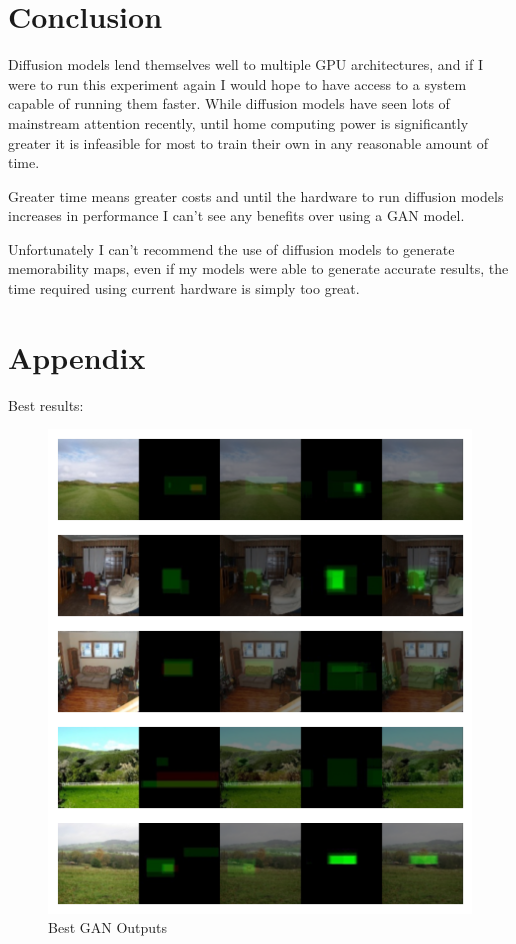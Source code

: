 \documentclass{UoYCSproject}
\begin{document}
\chapter{Conclusion}




Diffusion models lend themselves well to multiple GPU architectures, and if I were to run this experiment again I would hope to have access to a system capable of running them faster. While diffusion models have seen lots of mainstream attention recently, until home computing power is significantly greater it is infeasible for most to train their own in any reasonable amount of time. 

Greater time means greater costs and until the hardware to run diffusion models increases in performance I can't see any benefits over using a GAN model.

Unfortunately I can't recommend the use of diffusion models to generate memorability maps, even if my models were able to generate accurate results, the time required using current hardware is simply too great.

\printbibliography

\chapter{Appendix}

Best results:
\begin{figure}[ht]
    \centering
    \includegraphics[width=\linewidth]{Best GAN Outputs}
    \caption{Best GAN Outputs}
    \label{fig:GANBestOutput}
\end{figure}
\end{document}

